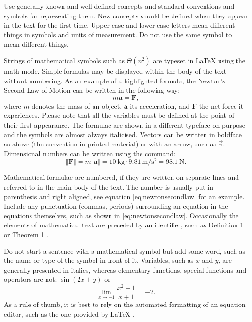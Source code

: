 Use generally known and well defined concepts and standard conventions and symbols for representing them. New concepts should be defined when they appear in the text for the first time. Upper case and lower case letters mean different things in symbols and units of measurement. Do not use the same symbol to mean different things.

Strings of mathematical symbols such as $\Theta(n^2)$ are typeset in \LaTeX{} using the math mode. Simple formulas may be displayed within the body of the text without numbering. As an example of a highlighted formula, the Newton’s Second Law of Motion can be written in the following way:
\begin{equation}\label{eq:newtonsecondlaw}
    m\mathbf{a} = \mathbf{F},
\end{equation}
where $m$ denotes the mass of an object, $\mathbf{a}$ its acceleration, and $\mathbf{F}$ the net force it experiences. Please note that all the variables must be defined at the point of their first appearance. The formulae are shown in a different typeface on purpose and the symbols are almost always italicised. Vectors can be written in boldface as above (the convention in printed material) or with an arrow, such as $\vec{v}$. Dimensional numbers can be written using the  command:
\begin{equation*}
    \Vert\mathbf{F}\Vert = m\Vert\mathbf{a}\Vert = \SI{10}{\kilogram} \cdot \SI{9.81}{\metre\per\second\squared} = \SI{98.1}{\newton}.
\end{equation*}

Mathematical formulae are numbered, if they are written on separate lines and referred to in the main body of the text. The number is usually put in parenthesis and right aligned, see equation \eqref{eq:newtonsecondlaw} for an example. Include any punctuation (commas, periods) surrounding an equation in the equations themselves, such as shown in \eqref{eq:newtonsecondlaw}. Occasionally the elements of mathematical text are preceded by an identifier, such as Definition 1 or Theorem 1 .

Do not start a sentence with a mathematical symbol but add some word, such as the name or type of the symbol in front of it. Variables, such as $x$ and $y$, are generally presented in italics, whereas elementary functions, special functions and operators are not: $\sin(2x + y)$ or
\begin{equation*}
    \lim_{x \rightarrow -1}\frac{x^2 - 1}{x + 1} = -2.
\end{equation*}
As a rule of thumb, it is best to rely on the automated formatting of an equation editor, such as the one provided by \LaTeX{} .

